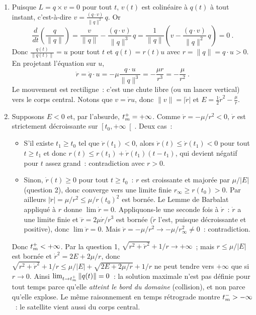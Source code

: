 \begin{enumerate}
\def\labelenumi{\alph{enumi})}
\item
  Puisque \(L=q\times v=0\) pour tout \(t\), \(v(t)\) est colinéaire à
  \(q(t)\) à tout instant, c'est-à-dire
  \(v = \frac{(q\cdot v)}{\|q\|^2}\,q\). Or \[
  \frac{d}{dt}\left(\frac{q}{\|q\|}\right) = \frac{v}{\|q\|} - \frac{(q\cdot v)}{\|q\|^3}\,q = \frac{1}{\|q\|}\left(v - \frac{(q\cdot v)}{\|q\|^2}\,q\right) = 0 \ .
  \] Donc \(\frac{q(t)}{\|q(t)\|} = u\) pour tout \(t\) et
  \(q(t) = r(t)u\) avec \(r = \|q\| = q\cdot u >0\). En projetant
  l'équation sur \(u\), \[
  \ddot r = \ddot q\cdot u = -\mu\frac{q\cdot u}{\|q\|^3} = -\frac{\mu r}{r^3} = -\frac{\mu}{r^2} \ .
  \] Le mouvement est rectiligne~: c'est une chute libre (ou un lancer
  vertical) vers le corps central. Notons que \(v = \dot r u\), donc
  \(\|v\| = |\dot r|\) et \(E = \frac{1}{2}\dot r^2 - \frac{\mu}{r}\).
\item
  Supposons \(E<0\) et, par l'absurde, \(t_m^+=+\infty\). Comme
  \(\ddot r = -\mu/r^2<0\), \(\dot r\) est strictement décroissante sur
  \(\left[t_0,+\infty\right[\). Deux cas~:

  \begin{itemize}
  \item
    S'il existe \(t_1\geq t_0\) tel que \(\dot r(t_1)<0\), alors
    \(\dot r(t)\leq \dot r(t_1)<0\) pour tout \(t\geq t_1\) et donc
    \(r(t)\leq r(t_1) + \dot r(t_1)(t-t_1)\), qui devient négatif pour
    \(t\) assez grand~: contradiction avec \(r>0\).
  \item
    Sinon, \(\dot r(t)\geq 0\) pour tout \(t\geq t_0\)~: \(r\) est
    croissante et majorée par \(\mu/|E|\) (question 2), donc converge
    vers une limite finie \(r_\infty \geq r(t_0)>0\). Par ailleurs
    \(|\ddot r| = \mu/r^2 \leq \mu/r(t_0)^2\) est bornée. Le Lemme de
    Barbalat appliqué à \(r\) donne \(\lim \dot r = 0\). Appliquons-le
    une seconde fois à \(\dot r\)~: \(\dot r\) a une limite finie et
    \(\dddot r = 2\mu\dot r/r^3\) est bornée (\(\dot r\) l'est,
    puisque décroissante et positive), donc \(\lim\ddot r = 0\). Mais
    \(\ddot r = -\mu/r^2 \to -\mu/r_\infty^2 \neq 0\)~: contradiction.
  \end{itemize}

  Donc \(t_m^+<+\infty\). Par la question 1,
  \(\sqrt{r^2+\dot r^2} + 1/r \to+\infty\)~; mais
  \(r\leq\mu/|E|\) est bornée et \(\dot r^2 = 2E+2\mu/r\), donc
  \(\sqrt{r^2+\dot r^2} + 1/r \leq \mu/|E| + \sqrt{2E + 2\mu/r} + 1/r\)
  ne peut tendre vers \(+\infty\) que si \(r\to 0\). Ainsi
  \(\lim_{t\to t_m^+}\|q(t)\| = 0\)~: la solution maximale n'est pas
  définie pour tout temps parce qu'elle \emph{atteint le bord du domaine}
  (collision), et non parce qu'elle explose. Le même raisonnement en
  temps rétrograde montre \(t_m^->-\infty\)~: le satellite
  \og vient \fg{} aussi du corps central.
\end{enumerate}

